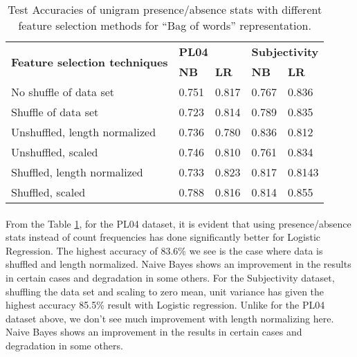 \documentclass[a4paper,26pt]{article}
\begin{document}
\begin{table}[H]
\centering
\begin{tabular}{|l|l|l|l|l|}
\hline
\multirow{2}{*}{\textbf{Feature selection techniques}} & \multicolumn{2}{l|}{\textbf{PL04}} & \multicolumn{2}{l|}{\textbf{Subjectivity}} \\ \cline{2-5} 
                                                       & \textbf{NB}      & \textbf{LR}     & \textbf{NB}          & \textbf{LR}         \\ \hline
No shuffle of data set                                 & 0.751            & 0.817           & 0.767                & 0.836               \\ \hline
Shuffle of data set                                    & 0.723            & 0.814           & 0.789                & 0.835               \\ \hline
Unshuffled, length normalized                          & 0.736            & 0.780           & 0.836                & 0.812               \\ \hline
Unshuffled, scaled                                     & 0.746            & 0.810           & 0.761                & 0.834               \\ \hline
Shuffled, length normalized                            & 0.733            & 0.823           & 0.817                & 0.8143              \\ \hline
Shuffled, scaled                                       & 0.788            & 0.816           & 0.814                & 0.855               \\ \hline
\end{tabular}
\caption{Test Accuracies of unigram presence/absence stats with different feature selection methods for ``Bag of words'' representation.}
\label{tab:testacc2}
\end{table}

\paragraph{}
From the Table \ref{tab:testacc2}, for the PL04 dataset, it is evident that using presence/absence stats instead of count frequencies has done significantly better for Logistic Regression. The highest accuracy of 83.6\% we see is the case where data is shuffled and length normalized. Naive Bayes shows an improvement in the results in certain cases and degradation in some others. For the Subjectivity dataset, shuffling the data set and scaling to zero mean, unit variance has given the highest accuracy 85.5\% result with Logistic regression. Unlike for the PL04 dataset above, we don't see much improvement with length normalizing here. Naive Bayes shows an improvement in the results in certain cases and degradation in some others.
\end{document}
